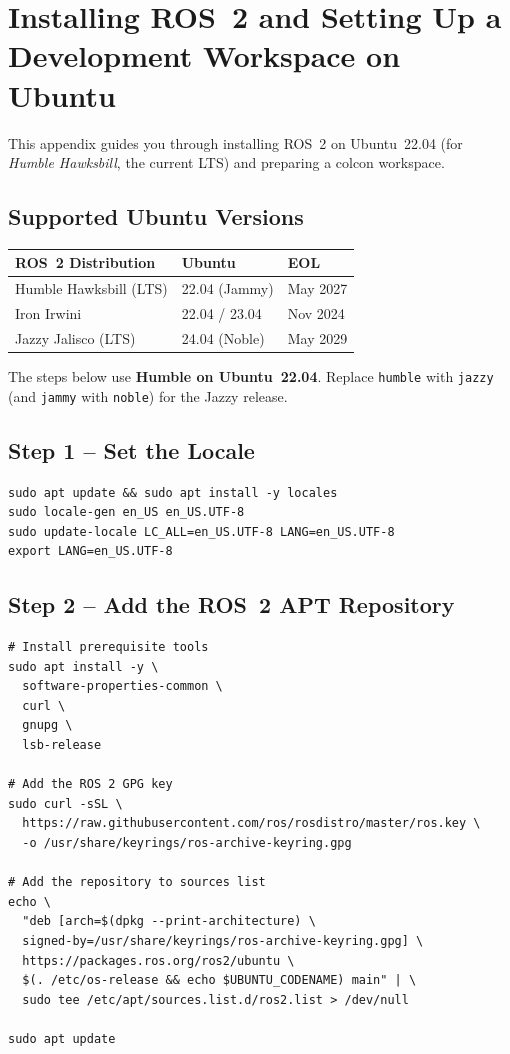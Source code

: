\documentclass[12pt,a4paper]{article}
\newcommand{\code}[1]{\texttt{#1}}
\begin{document}
\section{Installing ROS~2 and Setting Up a Development Workspace on Ubuntu}
\label{app:install}

This appendix guides you through installing ROS~2 on Ubuntu~22.04 (for
\emph{Humble Hawksbill}, the current LTS) and preparing a colcon workspace.

\subsection{Supported Ubuntu Versions}

\begin{center}
\begin{tabular}{lll}
  \toprule
  \textbf{ROS~2 Distribution} & \textbf{Ubuntu} & \textbf{EOL} \\
  \midrule
  Humble Hawksbill (LTS) & 22.04 (Jammy) & May 2027 \\
  Iron Irwini             & 22.04 / 23.04 & Nov 2024 \\
  Jazzy Jalisco (LTS)    & 24.04 (Noble) & May 2029 \\
  \bottomrule
\end{tabular}
\end{center}

The steps below use \textbf{Humble on Ubuntu~22.04}.  Replace
\code{humble} with \code{jazzy} (and \code{jammy} with \code{noble})
for the Jazzy release.

\subsection{Step 1 -- Set the Locale}

\begin{lstlisting}[style=bash]
sudo apt update && sudo apt install -y locales
sudo locale-gen en_US en_US.UTF-8
sudo update-locale LC_ALL=en_US.UTF-8 LANG=en_US.UTF-8
export LANG=en_US.UTF-8
\end{lstlisting}

\subsection{Step 2 -- Add the ROS~2 APT Repository}

\begin{lstlisting}[style=bash]
# Install prerequisite tools
sudo apt install -y \
  software-properties-common \
  curl \
  gnupg \
  lsb-release

# Add the ROS 2 GPG key
sudo curl -sSL \
  https://raw.githubusercontent.com/ros/rosdistro/master/ros.key \
  -o /usr/share/keyrings/ros-archive-keyring.gpg

# Add the repository to sources list
echo \
  "deb [arch=$(dpkg --print-architecture) \
  signed-by=/usr/share/keyrings/ros-archive-keyring.gpg] \
  https://packages.ros.org/ros2/ubuntu \
  $(. /etc/os-release && echo $UBUNTU_CODENAME) main" | \
  sudo tee /etc/apt/sources.list.d/ros2.list > /dev/null

sudo apt update
\end{lstlisting}
\end{document}
